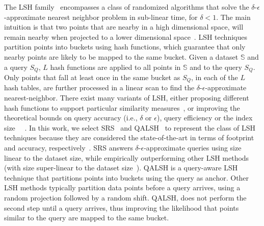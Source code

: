 {\color{black}  The LSH family}~\cite{journal/corr/andoni2018} encompasses a class of randomized algorithms that solve the $\delta$-$\epsilon$-approximate nearest neighbor problem in sub-linear time, for $\delta < 1 $. 
The main intuition 
is that two points that are nearby in a high dimensional space, will remain nearby when projected to a lower dimensional space~\cite{conf/stoc/indyk1998}. 
LSH techniques {\color{black}partition points into buckets} using hash functions, which guarantee that only nearby points are likely to be mapped to the same bucket. 
Given a dataset $\mathbb{S}$ and a query $S_Q$, $L$ hash functions are applied to all points in $\mathbb{S}$ and to the query $S_Q$. Only points that fall at least once in the same bucket as $S_Q$, in each of the $L$ hash tables, are further processed in a linear scan to find the $\delta$-$\epsilon$-approximate nearest-neighbor. 
There exist many variants of LSH, either proposing different hash functions to support particular similarity measures~\cite{conf/poccs/broder1997,conf/sigcg/datar2004,conf/stoc/charikar02,conf/sigmod/gan2012}, 
or improving the theoretical bounds on query accuracy (i.e., $\delta$ or $\epsilon$), query efficiency or the index size~\cite{journal/nips/liu2004,conf/soda/panigrahy2006,journal/siamdm/motwani2007,conf/vldb/lv2007,conf/sigmod/gan2012,journal/atct/odonnell2014,conf/vldb/sun14,qalsh} {\color{black}~\cite{sk-lsh}}. 
{\color{black}In this work, we select SRS~\cite{conf/vldb/sun14} and QALSH~\cite{qalsh} to represent the class of LSH techniques because they are considered the state-of-the-art in terms of footprint and accuracy, respectively~\cite{hdindex}}. SRS answers $\delta$-$\epsilon$-approximate queries using size linear to the dataset size, while empirically outperforming other LSH methods (with size super-linear to the dataset size~\cite{conf/poccs/broder1997}). 
{\color{black} QALSH is a query-aware LSH technique that partitions points into buckets using the query as anchor. Other LSH methods typically partition data points before a query arrives, using a random projection followed by a random shift. QALSH, does not perform the second step until a query arrives, thus improving the likelihood that points similar to the query are mapped to the same bucket.}


